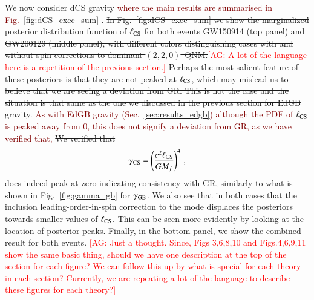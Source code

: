 \documentclass[twocolumn,
               prd,
               aps,
               superscriptaddress,
               tightenlines,
               nofootinbib,
               eqsecnum,
               amsfonts,
               amsmath,
               longbibliography]{revtex4-1}
\newcommand{\agcomm}[1]{{\textcolor{red}{{[AG: #1]}} }}
\newcommand{\ag}[1]{{\textcolor{Maroon}{{#1}} }}
\begin{document}
We now consider dCS gravity \ag{where the main results are summarised in Fig.~\ref{fig:dCS_exec_sum}}.
%
\sout{In Fig.~\ref{fig:dCS_exec_sum} we show the marginalized posterior distribution
function of $\ell_{\rm CS}$ for both events GW150914 (top panel) and GW200129
(middle panel), with different colors distinguishing cases with and without spin corrections to
dominant $(2,2,0)$~QNM.}\agcomm{A lot of the language here is a repetition of the previous section.}
%
\sout{Perhaps the most salient feature of these posteriors is that they are not
peaked at $\ell_{\rm CS}$, which may mislead us to believe that we are seeing a
deviation from GR. This is not the case and the situation is that same as the
one we discussed in the previous section for EdGB gravity.}
\ag{As with EdGB gravity (Sec.~\ref{sec:results_edgb}) although the PDF of $\ell_{\rm CS}$
is peaked away from 0, this does not signify a deviation from GR, as we have verified that,}
%
\sout{We verified that}
%
\begin{equation}
    \gamma_{\rm CS} = \left( \frac{c^2 \ell_{\rm CS}}{G M_{f}} \right)^{4}\,,
\end{equation}
%
does indeed peak at zero indicating consistency with GR, similarly to what is shown in Fig.~\ref{fig:gamma_gb} for $\gamma_{\rm GB}$.
%
We also see that in both cases that the inclusion leading-order-in-spin
correction to the mode displaces the posteriors towards smaller values of
$\ell_{\rm CS}$. This can be seen more evidently by looking at the location of
posterior peaks.
%
Finally, in the bottom panel, we show the combined result for both events.
\agcomm{Just a thought.  Since, Figs 3,6,8,10 and Figs.4,6,9,11 show the same basic thing,
should we have one description at the top of the section for each figure? We can follow this up
by what is special for each theory in each section? Currently, we are repeating a lot of the 
language to describe these figures for each theory?}
\end{document}
